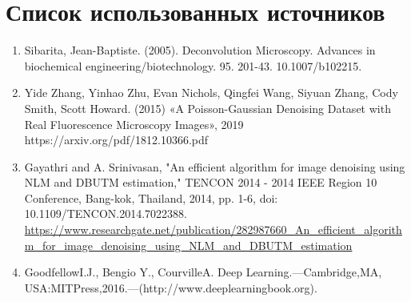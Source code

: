 \clearpage                                  %
\chapter*{Список использованных источников}	
\label{references}
\printbibliography[env=SSTfirst]  
\begin{enumerate}[]
	\item Sibarita, Jean-Baptiste. (2005). Deconvolution Microscopy. Advances in biochemical engineering/biotechnology. 95. 201-43. 10.1007/b102215.
	\item Yide Zhang, Yinhao Zhu, Evan Nichols, Qingfei Wang, Siyuan Zhang, Cody Smith, Scott Howard. (2015) «A Poisson-Gaussian Denoising Dataset with Real Fluorescence Microscopy Images», 2019 https://arxiv.org/pdf/1812.10366.pdf 
	\item Gayathri and A. Srinivasan, "An efficient algorithm for image denoising using NLM and DBUTM estimation," TENCON 2014 - 2014 IEEE Region 10 Conference, Bang-kok, Thailand, 2014, pp. 1-6, doi: 10.1109/TENCON.2014.7022388. \url{https://www.researchgate.net/publication/282987660_An_efficient_algorithm_for_image_denoising_using_NLM_and_DBUTM_estimation}
	\item GoodfellowI.J., Bengio Y., CourvilleA. Deep Learning.—Cambridge,MA,
	USA:MITPress,2016.—(http://www.deeplearningbook.org).
\end{enumerate}   





